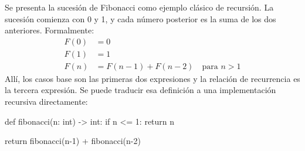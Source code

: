 Se presenta la sucesión de Fibonacci como ejemplo clásico de recursión. La sucesión comienza con 0 y 1, y cada número posterior es la suma de los dos anteriores. Formalmente:
\begin{align*}
    F(0) &= 0 \\
    F(1) &= 1 \\
    F(n) &= F(n-1) + F(n-2) \quad \text{para } n > 1
\end{align*}
Allí, los casos base son las primeras dos expresiones y la relación de recurrencia es la tercera expresión. Se puede traducir esa definición a una implementación recursiva directamente:
\begin{pseudocode}
def fibonacci(n: int) -> int:
    if n <= 1: 
        return n

    return fibonacci(n-1) + fibonacci(n-2)
\end{pseudocode}




